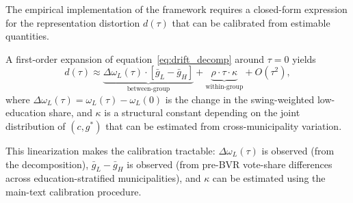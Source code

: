 The empirical implementation of the framework requires a closed-form expression for the representation distortion $d(\tau)$ that can be calibrated from estimable quantities.

A first-order expansion of equation~\eqref{eq:drift_decomp} around $\tau = 0$ yields
\begin{equation}
d(\tau) \approx \underbrace{\Delta\omega_L(\tau) \cdot [\bar g_L - \bar g_H]}_{\text{between-group}} + \underbrace{\rho \cdot \tau \cdot \kappa}_{\text{within-group}} + O(\tau^2),
\label{eq:linearized_drift}
\end{equation}
where $\Delta\omega_L(\tau) = \omega_L(\tau) - \omega_L(0)$ is the change in the swing-weighted low-education share, and $\kappa$ is a structural constant depending on the joint distribution of $(c, g^*)$ that can be estimated from cross-municipality variation.

This linearization makes the calibration tractable: $\Delta\omega_L(\tau)$ is observed (from the decomposition), $\bar g_L - \bar g_H$ is observed (from pre-BVR vote-share differences across education-stratified municipalities), and $\kappa$ can be estimated using the main-text calibration procedure.
